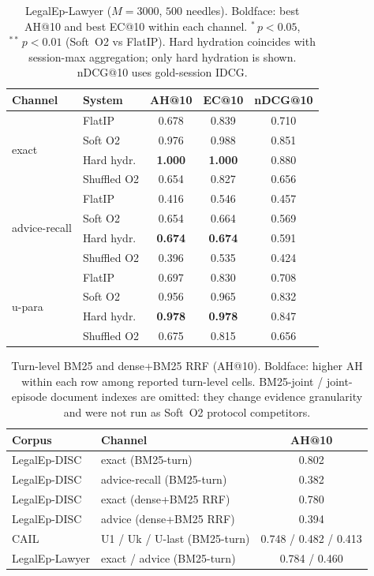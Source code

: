 \documentclass[preprint,12pt,authoryear]{elsarticle}
\newcommand{\compacttab}{\setlength{\tabcolsep}{4.5pt}\renewcommand{\arraystretch}{1.05}}
\begin{document}
\begin{table}[H]
\centering
\caption{LegalEp-Lawyer ($M{=}3000$, $500$ needles). Boldface: best AH@10 and best EC@10 within each channel. ${}^{*}\,p{<}0.05$, ${}^{**}\,p{<}0.01$ (Soft~O2 vs FlatIP). Hard hydration coincides with session-max aggregation; only hard hydration is shown. nDCG@10 uses gold-session IDCG.}
\label{tab:lawyer_main}
\compacttab\footnotesize
\begin{tabular}{@{}llccc@{}}
\toprule
\textbf{Channel} & \textbf{System} & \textbf{AH@10} & \textbf{EC@10} & \textbf{nDCG@10} \\
\midrule
\multirow{4}{*}{exact}
 & FlatIP & 0.678 & 0.839 & 0.710 \\
 & Soft O2 & 0.976 & 0.988 & 0.851 \\
 & Hard hydr. & \textbf{1.000} & \textbf{1.000} & 0.880 \\
 & Shuffled O2 & 0.654 & 0.827 & 0.656 \\
\midrule
\multirow{4}{*}{advice-recall}
 & FlatIP & 0.416 & 0.546 & 0.457 \\
 & Soft O2 & 0.654 & 0.664 & 0.569 \\
 & Hard hydr. & \textbf{0.674} & \textbf{0.674} & 0.591 \\
 & Shuffled O2 & 0.396 & 0.535 & 0.424 \\
\midrule
\multirow{4}{*}{u-para}
 & FlatIP & 0.697 & 0.830 & 0.708 \\
 & Soft O2 & 0.956 & 0.965 & 0.832 \\
 & Hard hydr. & \textbf{0.978} & \textbf{0.978} & 0.847 \\
 & Shuffled O2 & 0.675 & 0.815 & 0.656 \\
\bottomrule
\end{tabular}
\end{table}

\begin{table}[H]
\centering
\caption{Turn-level BM25 and dense+BM25 RRF (AH@10). Boldface: higher AH within each row among reported turn-level cells. BM25-joint / joint-episode document indexes are omitted: they change evidence granularity and were not run as Soft~O2 protocol competitors.}
\label{tab:bm25}
\compacttab\footnotesize
\begin{tabular}{@{}llc@{}}
\toprule
\textbf{Corpus} & \textbf{Channel} & \textbf{AH@10} \\
\midrule
LegalEp-DISC & exact (BM25-turn) & 0.802 \\
LegalEp-DISC & advice-recall (BM25-turn) & 0.382 \\
LegalEp-DISC & exact (dense+BM25 RRF) & 0.780 \\
LegalEp-DISC & advice (dense+BM25 RRF) & 0.394 \\
CAIL & U1 / Uk / U-last (BM25-turn) & 0.748 / 0.482 / 0.413 \\
LegalEp-Lawyer & exact / advice (BM25-turn) & 0.784 / 0.460 \\
\bottomrule
\end{tabular}
\end{table}
\end{document}
